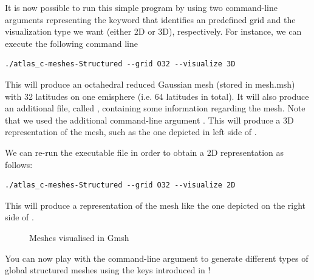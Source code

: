 It is now possible to run this simple program by using 
two command-line arguments representing the keyword that 
identifies an \Atlas predefined grid and the visualization 
type we want (either 2D or 3D), respectively. For instance, 
we can execute the following command line
%
\begin{lstlisting}[style=BashStyle]
./atlas_c-meshes-Structured --grid O32 --visualize 3D
\end{lstlisting}
% 
This will produce an octahedral reduced Gaussian mesh 
(stored in mesh.msh) with 32 latitudes on one emisphere 
(i.e. 64 latitudes in total). It will also produce an 
additional file, called , containing
some information regarding the mesh.
Note that we used the additional command-line argument 
. This will produce a 3D representation 
of the mesh, such as the one depicted in left side of 
.

We can re-run the executable file in order to obtain 
a 2D representation as follows:
%
\begin{lstlisting}[style=BashStyle]
./atlas_c-meshes-Structured --grid O32 --visualize 2D
\end{lstlisting}
% 
This will produce a representation of the mesh like 
the one depicted on the right side of .
%
\begin{figure}%
\centering
{}\qquad\qquad\qquad
{}
\caption{Meshes visualised in Gmsh}%
\label{fig:meshes}%
\end{figure}
%
You can now play with the command-line argument to generate 
different types of global structured meshes using the keys 
introduced in !




